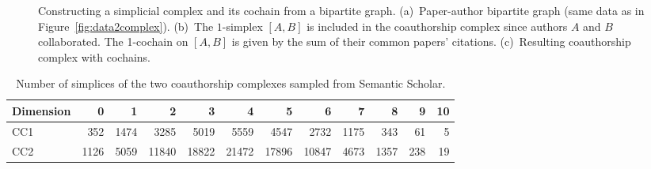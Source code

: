 \begin{figure}[htpb]
{
}%
\settowidth{\tempwidth}{\usebox{\tempbox}}%
\hfil\begin{minipage}[b]{\tempwidth}%
\raisebox{-\height}{\usebox{\tempbox}}%
\scriptsize{}%
\end{minipage}%
\vspace{5pt}
\savebox{\tempbox}{

}%
\settowidth{\tempwidth}{\usebox{\tempbox}}%
\hfil\begin{minipage}[b]{\tempwidth}%
\raisebox{-\height}{\usebox{\tempbox}}%
\scriptsize{}%
\end{minipage}%
\caption{%
    Constructing a simplicial complex and its cochain from a bipartite graph.
    (a)~Paper-author bipartite graph (same data as in Figure~\ref{fig:data2complex}).
    (b)~The $1$-simplex $[A,B]$ is included in the coauthorship complex since authors $A$ and $B$ collaborated.
    The 1-cochain on $[A,B]$ is given by the sum of their common papers' citations.
    (c)~Resulting coauthorship complex with cochains.
}\label{fig:bipartite}
\end{figure}

\begin{table}[htbp]
  \centering
  \scriptsize{
  \begin{tabular}{lrrrrrrrrrrr}
    \toprule
    Dimension   & 0     & 1  & 2     & 3 & 4     & 5 & 6    & 7 & 8   & 9 & 10\\
    \midrule
    CC1 & 352  & 1474  & 3285  & 5019  & 5559  & 4547  & 2732  & 1175  & 343 & 61 & 5\\
    CC2 & 1126 & 5059 & 11840 & 18822 & 21472 & 17896  & 10847 & 4673 & 1357 & 238 & 19\\
    \bottomrule
  \end{tabular}}
  \vspace{2pt}
  \caption{%
  Number of simplices of the two coauthorship complexes sampled from Semantic Scholar.
  } \label{table:Simplices-coauthor}
\end{table}

